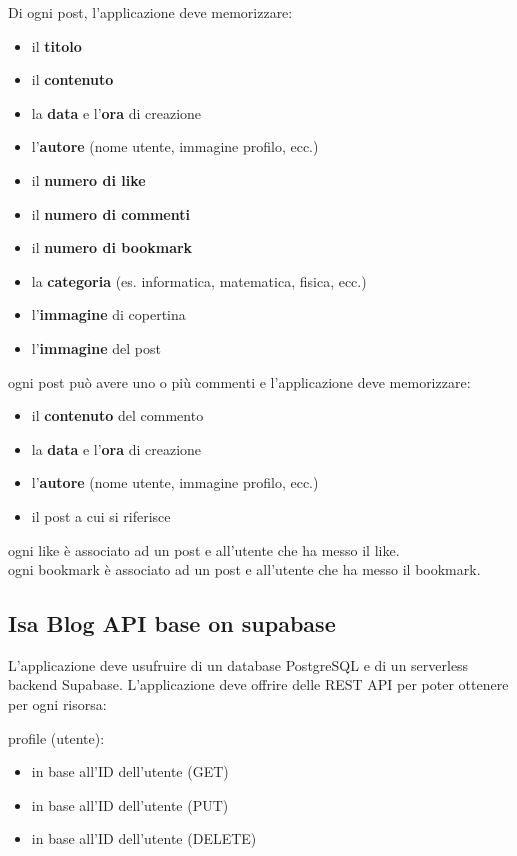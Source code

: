 \documentclass{article}
\begin{document}
Di ogni post, l'applicazione deve memorizzare:
\begin{itemize}
    \item il \textbf{titolo}
    \item il \textbf{contenuto}
    \item la \textbf{data} e l'\textbf{ora} di creazione
    \item l'\textbf{autore} (nome utente, immagine profilo, ecc.)
    \item il \textbf{numero di like}
    \item il \textbf{numero di commenti}
    \item il \textbf{numero di bookmark}
    \item la \textbf{categoria} (es. informatica, matematica, fisica, ecc.)
    \item l'\textbf{immagine} di copertina
    \item l'\textbf{immagine} del post
\end{itemize}

ogni post può avere uno o più commenti e l'applicazione deve memorizzare:
\begin{itemize}
    \item il \textbf{contenuto} del commento
    \item la \textbf{data} e l'\textbf{ora} di creazione
    \item l'\textbf{autore} (nome utente, immagine profilo, ecc.)
    \item il post a cui si riferisce
\end{itemize}

ogni like è associato ad un post e all'utente che ha messo il like.\\
ogni bookmark è associato ad un post e all'utente che ha messo il bookmark.


\subsection{Isa Blog API base on supabase}

L'applicazione deve usufruire di un database PostgreSQL e di un serverless backend Supabase.
L'applicazione deve offrire delle REST API per poter ottenere per ogni risorsa:

profile (utente):
\begin{itemize}
    \item in base all'ID dell'utente (GET)
    \item in base all'ID dell'utente (PUT)
    \item in base all'ID dell'utente (DELETE)
\end{itemize}
\end{document}
